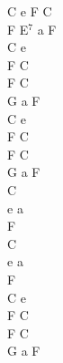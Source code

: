 \documentclass[a5paper, 10pt]{book}
\begin{document}
\begin{minipage}[t]{0.3\textwidth}
C e F C\\
F E$^7$ a F\\
C e\\
F C\\
F C\\
G a F\\

C e\\
F C\\
F C\\
G a F\\

C\\
e a\\
F\\
C\\
e a\\
F\\

C e\\
F C\\
F C\\
G a F\\
\end{minipage}

\newpage
\end{document}
